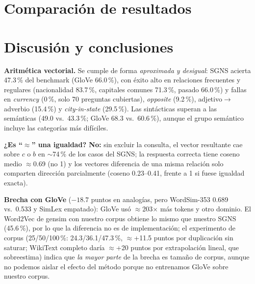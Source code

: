 \documentclass[10pt,a4paper]{article}
\begin{document}
\section{Comparación de resultados}
\begin{table}[H]\centering\footnotesize
\resizebox{\textwidth}{!}{}
\caption{SGNS propio vs.\ Word2Vec de gensim vs.\ GloVe. $^*$GloVe: tiempos reportados por Pennington et al.\ (2014) (X$\approx$85\,min con 1 hilo; 14\,min/iteración con 300 dim y 32 núcleos; 50 iteraciones para $d<300$); el tiempo por iteración a 100 dim no se reporta.}\label{tab:cmp}
\end{table}

\section{Discusión y conclusiones}
\textbf{Aritmética vectorial.} Se cumple de forma \textit{aproximada y desigual}: SGNS acierta 47.3\,\% del benchmark (GloVe 66.0\,\%), con éxito alto en relaciones frecuentes y regulares (nacionalidad 83.7\,\%, capitales comunes 71.3\,\%, pasado 66.0\,\%) y fallas en \textit{currency} (0\,\%, solo 70 preguntas cubiertas), \textit{opposite} (9.2\,\%), adjetivo$\to$adverbio (15.4\,\%) y \textit{city-in-state} (29.5\,\%). Las sintácticas superan a las semánticas (49.0 vs.\ 43.3\,\%; GloVe 68.3 vs.\ 60.6\,\%), aunque el grupo semántico incluye las categorías más difíciles. \par\smallskip\textbf{¿Es ``$\approx$'' una igualdad? No:} sin excluir la consulta, el vector resultante cae sobre $c$ o $b$ en $\sim$74\,\% de los casos del SGNS; la respuesta correcta tiene coseno medio $\approx$0.69 (no 1) y los vectores diferencia de una misma relación solo comparten dirección parcialmente (coseno 0.23--0.41, frente a 1 si fuese igualdad exacta). \par\smallskip\textbf{Brecha con GloVe} ($-18.7$ puntos en analogías, pero WordSim-353 0.689 vs.\ 0.533 y SimLex empatado): GloVe usó $\approx$203$\times$ más tokens y otro dominio. El Word2Vec de gensim con nuestro corpus obtiene lo mismo que nuestro SGNS (45.6\,\%), por lo que la diferencia no es de implementación; el experimento de corpus (25/50/100\,\%: 24.3/36.1/47.3\,\%, $\approx$+11.5 puntos por duplicación sin saturar; WikiText completo daría $\approx$+20 puntos por extrapolación lineal, que sobreestima) indica que \textit{la mayor parte} de la brecha es tamaño de corpus, aunque no podemos aislar el efecto del método porque no entrenamos GloVe sobre nuestro corpus.
\end{document}
